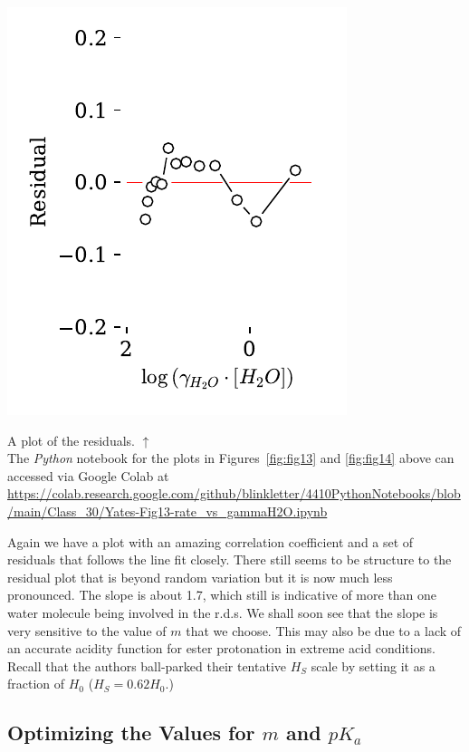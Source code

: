 \documentclass[]{tufte-handout}
\begin{document}
\begin{marginfigure}[10mm]
  \centering
  \includegraphics[scale=0.7]{images/fig13r}
  \caption{A plot of the residuals. $\uparrow$  \\ \vspace{3mm} The \textit{Python} notebook for the plots in Figures~\ref{fig:fig13} and \ref{fig:fig14} above can accessed via Google Colab at \url{https://colab.research.google.com/github/blinkletter/4410PythonNotebooks/blob/main/Class_30/Yates-Fig13-rate_vs_gammaH2O.ipynb}} 
  \label{fig:fig14}
\end{marginfigure}

Again we have a plot with an amazing correlation coefficient and a set of residuals that follows the line fit closely. There still seems to be structure to the residual plot that is beyond random variation but it is now much less pronounced. The slope is about 1.7, which still is indicative of more than one water molecule being involved in the r.d.s. We shall soon see that the slope is very sensitive to the value of $m$ that we choose. This may also be due to a lack of an accurate acidity function for ester protonation in extreme acid conditions. Recall that the authors ball-parked their tentative $H_S$ scale by setting it as a fraction of $H_0$ ($H_S = 0.62H_0$.)
\clearpage
\subsection{Optimizing the Values for $m$ and $pK_a$}
\end{document}
